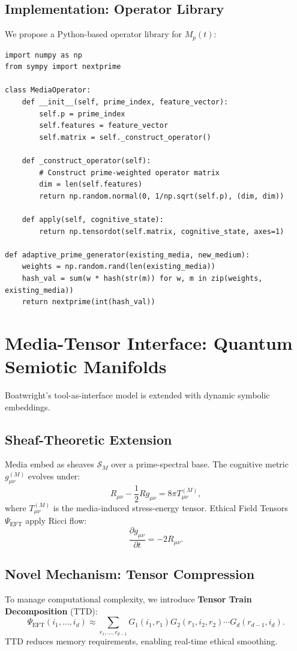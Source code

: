 \documentclass[12pt]{article}
\begin{document}
\subsection{Implementation: Operator Library}
We propose a Python-based operator library for $M_p(t)$:
\begin{verbatim}
import numpy as np
from sympy import nextprime

class MediaOperator:
    def __init__(self, prime_index, feature_vector):
        self.p = prime_index
        self.features = feature_vector
        self.matrix = self._construct_operator()

    def _construct_operator(self):
        # Construct prime-weighted operator matrix
        dim = len(self.features)
        return np.random.normal(0, 1/np.sqrt(self.p), (dim, dim))

    def apply(self, cognitive_state):
        return np.tensordot(self.matrix, cognitive_state, axes=1)

def adaptive_prime_generator(existing_media, new_medium):
    weights = np.random.rand(len(existing_media))
    hash_val = sum(w * hash(str(m)) for w, m in zip(weights, existing_media))
    return nextprime(int(hash_val))
\end{verbatim}

\section{Media-Tensor Interface: Quantum Semiotic Manifolds}
Boatwright’s tool-as-interface model is extended with dynamic symbolic embeddings.

\subsection{Sheaf-Theoretic Extension}
Media embed as sheaves $\mathcal{S}_M$ over a prime-spectral base. The cognitive metric $g_{\mu\nu}^{(M)}$ evolves under:
\[
R_{\mu\nu} - \frac{1}{2} R g_{\mu\nu} = 8\pi T_{\mu\nu}^{(M)},
\]
where $T_{\mu\nu}^{(M)}$ is the media-induced stress-energy tensor. Ethical Field Tensors $\Psi_{\text{EFT}}$ apply Ricci flow:
\[
\frac{\partial g_{\mu\nu}}{\partial t} = -2 R_{\mu\nu}.
\]

\subsection{Novel Mechanism: Tensor Compression}
To manage computational complexity, we introduce \textbf{Tensor Train Decomposition} (TTD):
\[
\Psi_{\text{EFT}}(i_1, \ldots, i_d) \approx \sum_{r_1, \ldots, r_{d-1}} G_1(i_1, r_1) G_2(r_1, i_2, r_2) \cdots G_d(r_{d-1}, i_d).
\]
TTD reduces memory requirements, enabling real-time ethical smoothing.
\end{document}
